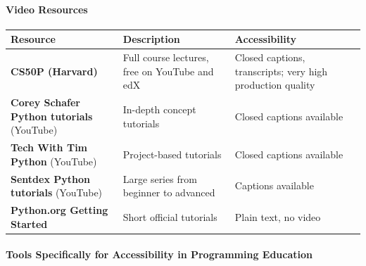 \documentclass[
  justified,
  openright,
]{tufte-book}
\let\subsubsection\paragraph
\let\paragraph\paragraph
\let\subsubsection\paragraph
\let\paragraph\paragraph
\begin{document}
\subsubsection{Video Resources}\label{video-resources}

{\def\LTcaptype{none} %
\begin{longtable}[]{@{}
  >{\raggedright\arraybackslash}p{}
  >{\raggedright\arraybackslash}p{}
  >{\raggedright\arraybackslash}p{}@{}}
\toprule\noalign{}
\begin{minipage}[b]{\linewidth}\raggedright
Resource
\end{minipage} & \begin{minipage}[b]{\linewidth}\raggedright
Description
\end{minipage} & \begin{minipage}[b]{\linewidth}\raggedright
Accessibility
\end{minipage} \\
\midrule\noalign{}
\endhead
\bottomrule\noalign{}
\endlastfoot
\textbf{CS50P (Harvard)} & Full course lectures, free on YouTube and edX
& Closed captions, transcripts; very high production quality \\
\textbf{Corey Schafer Python tutorials} (YouTube) & In-depth concept
tutorials & Closed captions available \\
\textbf{Tech With Tim Python} (YouTube) & Project-based tutorials &
Closed captions available \\
\textbf{Sentdex Python tutorials} (YouTube) & Large series from beginner
to advanced & Captions available \\
\textbf{Python.org Getting Started} & Short official tutorials & Plain
text, no video \\
\end{longtable}
}

\subsubsection{Tools Specifically for Accessibility in Programming
Education}\label{tools-specifically-for-accessibility-in-programming-education}
\end{document}
